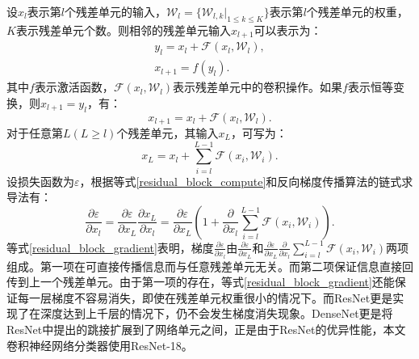 设$x_l$表示第$l$个残差单元的输入，$\mathcal{W}_{l}=\{\mathcal{W}_{l,k}|_{1\leq k \leq K}\}$表示第$l$个残差单元的权重，$K$表示残差单元个数。则相邻的残差单元输入$x_{l+1}$可以表示为：
\begin{gather}
	y_{l}=x_l + \mathcal{F}(x_l, \mathcal{W}_l), \\
	x_{l+1}=f(y_{l}).
\end{gather}
其中$f$表示激活函数，$\mathcal{F}(x_l, \mathcal{W}_l)$表示残差单元中的卷积操作。如果$f$表示恒等变换，则$x_{l+1}=y_{l}$，有：
\begin{equation}
	x_{l+1}=x_l + \mathcal{F}(x_l, \mathcal{W}_l).
\end{equation}
对于任意第$L(L\ge l)$个残差单元，其输入$x_{L}$，可写为：
\begin{equation}\label{residual_block_compute}
x_{L}=x_l + \sum_{i=l}^{L-1}\mathcal{F}(x_i, \mathcal{W}_i).
\end{equation}
设损失函数为$\varepsilon$，根据等式\ref{residual_block_compute}和反向梯度传播算法的链式求导法有：
\begin{equation}\label{residual_block_gradient}
\frac{\partial \varepsilon}{\partial x_l}=\frac{\partial \varepsilon}{\partial x_L}\frac{\partial x_L}{\partial x_l}=\frac{\partial \varepsilon}{\partial x_L}(1+\frac{\partial}{\partial x_l}\sum_{i=l}^{L-1}\mathcal{F}(x_i,\mathcal{W}_i)).
\end{equation}
等式\ref{residual_block_gradient}表明，梯度$\frac{\partial \varepsilon}{\partial x_l}$由$\frac{\partial \varepsilon}{\partial x_L}$和$\frac{\partial \varepsilon}{\partial x_L}\frac{\partial}{\partial x_l}\sum_{i=l}^{L-1}\mathcal{F}(x_i,\mathcal{W}_i)$两项组成。第一项在可直接传播信息而与任意残差单元无关。而第二项保证信息直接回传到上一个残差单元。由于第一项的存在，等式\ref{residual_block_gradient}还能保证每一层梯度不容易消失，即使在残差单元权重很小的情况下。而ResNet更是实现了在深度达到上千层的情况下，仍不会发生梯度消失现象。DenseNet更是将ResNet中提出的跳接扩展到了网络单元之间，正是由于ResNet的优异性能，本文卷积神经网络分类器使用ResNet-18。
